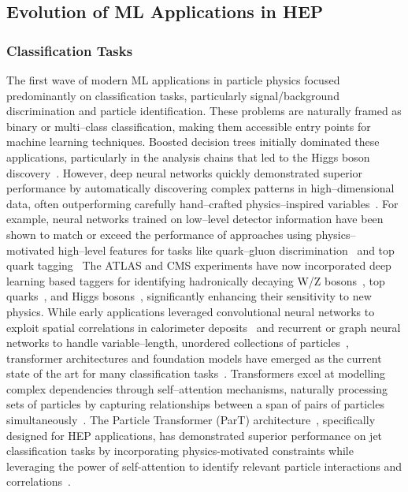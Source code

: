 \subsection{Evolution of ML Applications in HEP}
\subsubsection{Classification Tasks}
The first wave of modern ML applications in particle physics focused predominantly on classification tasks, particularly signal/background discrimination and particle identification.
%
These problems are naturally framed as binary or multi--class classification, making them accessible entry points for machine learning techniques.
%
Boosted decision trees initially dominated these applications, particularly in the analysis chains that led to the Higgs boson discovery~\cite{Chen2014HiggsTrees}.
%
However, deep neural networks quickly demonstrated superior performance by automatically discovering complex patterns in high--dimensional data, often outperforming carefully hand--crafted physics--inspired variables~\cite{Baldi2014SearchingLearning, Baldi2015EnhancedLearning, Baldi2021DeepScience}.
%
For example, neural networks trained on low--level detector information have been shown to match or exceed the performance of approaches using physics--motivated high--level features for tasks like quark--gluon discrimination~\cite{Lee2019Quark-GluonNetworks} and top quark tagging~\cite{Pearkes2017JetTagging}
%
The ATLAS and CMS experiments have now incorporated deep learning based taggers for identifying hadronically decaying W/Z bosons~\cite{Chen2020BoostedLearning}, top quarks~\cite{Sirunyan_2020}, and Higgs bosons~\cite{2023TransformerATLAS}, significantly enhancing their sensitivity to new physics.
%
While early applications leveraged convolutional neural networks to exploit spatial correlations in calorimeter deposits~\cite{deOliveira2016Jet-imagesEdition, Komiske2018DeepDiscrimination} and recurrent or graph neural networks to handle variable--length, unordered collections of particles~\cite{Shlomi2020GraphPhysics, Qu2020ParticleNet:Clouds}, transformer architectures and foundation models have emerged as the current state of the art for many classification tasks~\cite{Qu2022ParticleTagging, Mikuni2025SolvingModels, VanStroud2024TransformersPhysics}.
%
Transformers excel at modelling complex dependencies through self--attention mechanisms, naturally processing sets of particles by capturing relationships between a span of pairs of particles simultaneously~\cite{Vaswani2017AttentionNeed}.
%
The Particle Transformer (ParT) architecture~\cite{Qu2022ParticleTagging}, specifically designed for HEP applications, has demonstrated superior performance on jet classification tasks by incorporating physics-motivated constraints while leveraging the power of self-attention to identify relevant particle interactions and correlations~\cite{Wang2024InterpretingTagging}.

